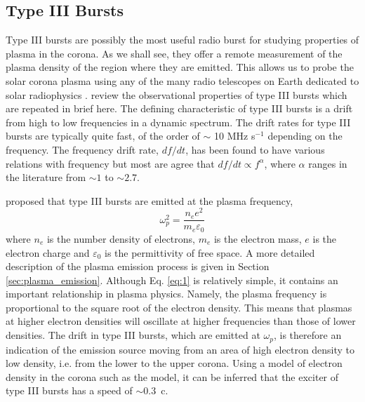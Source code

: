 \subsection{Type III Bursts}
\label{sec:typeIII} 
Type III bursts are possibly the most useful radio burst for studying properties of plasma in the corona. As we shall see, they offer a remote measurement of the plasma density of the region where they are emitted. This allows us to probe the solar corona plasma using any of the many radio telescopes on Earth dedicated to solar radiophysics \citep[e.g.][]{Benz2004}.
\cite{Reid2014} review the observational properties of type III bursts which are repeated in brief here. The defining characteristic of type III bursts is a drift from high to low frequencies in a dynamic spectrum. The drift rates for type III bursts are typically quite fast, of the order of $\sim$ 10 MHz s$^{-1}$ depending on the frequency. The frequency drift rate, $df/dt$, has been found to have various relations with frequency \citep{Reid2014} but most are agree that $df/dt \propto f^{\alpha}$, where $\alpha$ ranges in the literature from $\sim 1$ to $\sim 2.7$. 

\cite{Ginzburg1958} proposed that type III bursts are emitted at the plasma frequency,
\begin{equation}\label{eq:1}
    \omega_{p}^2 = \frac{n_e e^2}{m_e \varepsilon_0}
\end{equation}
where $n_e$ is the number density of electrons, $m_e$ is the electron mass, $e$ is the electron charge and $\varepsilon_0$ is the permittivity of free space. A more detailed description of the plasma emission process is given in Section \ref{sec:plasma_emission}.
Although Eq. \ref{eq:1} is relatively simple, it contains an important relationship in plasma physics. Namely, the plasma frequency is proportional to the square root of the electron density. This means that plasmas at higher electron densities will oscillate at higher frequencies than those of lower densities. The drift in type III bursts, which are emitted at $\omega_p$, is therefore an indication of the emission source moving from an area of high electron density to low density, i.e. from the lower to the upper corona. Using a model of electron density in the corona such as the \cite{Newkirk1961} model, it can be inferred that the exciter of type III bursts has a speed of $\sim 0.3$~c.

